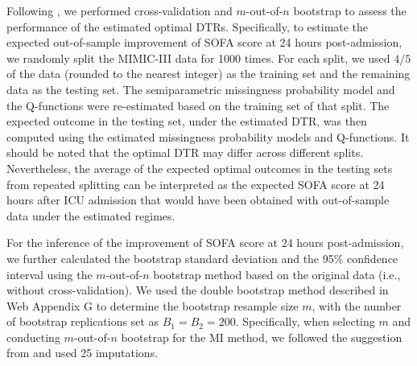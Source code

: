 \documentclass[12pt]{article}
\begin{document}

Following \cite{xu2015regularized}, we performed cross-validation and $m$-out-of-$n$ bootstrap to assess the performance of the estimated optimal DTRs. Specifically, to estimate the expected out-of-sample improvement of SOFA score at 24 hours post-admission, we randomly split the MIMIC-III data for 1000 times. For each split, we used $4/5$ of the data (rounded to the nearest integer) as the training set and the remaining data as the testing set. 
The semiparametric missingness probability model and the Q-functions were re-estimated based on the training set of that split. The expected outcome in the testing set, under the estimated DTR, was then computed using the estimated missingness probability models and Q-functions. It should be noted that the optimal DTR may differ across different splits. Nevertheless, the average of the expected optimal outcomes in the testing sets from repeated splitting can be interpreted as the expected SOFA score at 24 hours after ICU admission that would have been obtained with out-of-sample data under the estimated regimes.

For the inference of the improvement of SOFA score at 24 hours post-admission, we further calculated the bootstrap standard deviation and the 95\% confidence interval  %
using the $m$-out-of-$n$ bootstrap method based on the original data (i.e., without cross-validation). We used the double bootstrap method described in Web Appendix G to determine the bootstrap resample size $m$, with the number of bootstrap replications set as $B_1=B_2=200$. Specifically, when selecting $m$ and conducting $m$-out-of-$n$ bootstrap for the MI method, we followed the suggestion from \cite{Shen_Hubbard_Linn_2023} and used 25 imputations.  

 

\end{document}

